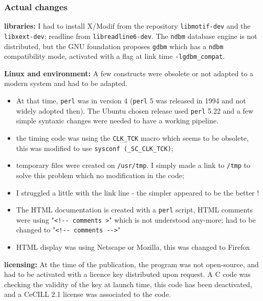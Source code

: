 \hypertarget{actual-changes}{%
\subsubsection{Actual changes}\label{actual-changes}}

\textbf{libraries:} I had to install X/Modif from the repository
\texttt{libmotif-dev} and the \texttt{libxext-dev}; readline from
\texttt{libreadline6-dev}. The \texttt{ndbm} database engine is not
distributed, but the GNU foundation proposes \texttt{gdbm} which has a
\texttt{ndbm} compatibility mode, activated with a flag at link time
\texttt{-lgdbm\_compat}.

\textbf{Linux and environment:} A few constructs were obsolete or not
adapted to a modern system and had to be adapted.

\begin{itemize}
\tightlist
\item
  At that time, \texttt{perl} was in version 4 (\texttt{perl} 5 was
  released in 1994 and not widely adopted then). The Ubuntu chosen
  release used \texttt{perl} 5.22 and a few simple syntaxic changes were
  needed to have a working pipeline.
\item
  the timing code was using the \texttt{CLK\_TCK} macro which seems to
  be obsolete, this was modified to use
  \texttt{sysconf\ (\_SC\_CLK\_TCK)};
\item
  temporary files were created on \texttt{/usr/tmp}. I simply made a
  link to \texttt{/tmp} to solve this problem which no modification in
  the code;
\item
  I struggled a little with the link line - the simpler appeared to be
  the better !
\item
  The HTML documentation is created with a \texttt{perl} script, HTML
  comments were using
  "\texttt{\textless{}!-\/-\ comments\ \textgreater{}}" which is not
  understood any-more; had to be changed to
  "\texttt{\textless{}!-\/-\ comments\ -\/-\textgreater{}}"
\item
  HTML display was using Netscape or Mozilla, this was changed to
  Firefox 
\end{itemize}

\textbf{licensing:} At the time of the publication, the program was not
open-source, and had to be activated with a licence key distributed upon
request. A C code was checking the validity of the key at launch time,
this code has been deactivated, and a CeCILL 2.1 license \cite{CeCILL} was associated
to the code.

